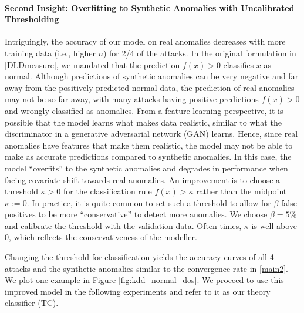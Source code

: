 \documentclass{article}
\begin{document}
\paragraph*{Second Insight: Overfitting to Synthetic Anomalies with Uncalibrated Thresholding}
Intriguingly, the accuracy of our model on real anomalies decreases with more training data (i.e., higher $n$) for 2/4 of the attacks.
In the original formulation in \eqref{DLDmeasure}, we mandated that the prediction $f(x)>0$ classifies $x$ as normal.
Although predictions of synthetic anomalies can be very negative and far away from the positively-predicted normal data, 
the prediction of real anomalies may not be so far away, with many attacks having positive predictions $f(x)>0$ and wrongly classified as anomalies.
From a feature learning perspective, it is possible that the model learns what makes data realistic, similar to what the discriminator in a generative adversarial network (GAN) learns.
Hence, since real anomalies have features that make them realistic, the model may not be able to make as accurate predictions compared to synthetic anomalies.
In this case, the model ``overfits'' to the synthetic anomalies and degrades in performance when facing covariate shift towards real anomalies.
An improvement is to choose a threshold $\kappa >0$ for the classification rule $f(x)>\kappa$ rather than the midpoint $\kappa:=0$.
In practice, it is quite common to set such a threshold to allow for $\beta$ false positives to be more ``conservative'' to detect more anomalies.
We choose $\beta=5\%$ and calibrate the threshold with the validation data.
Often times, $\kappa$ is well above 0, which reflects the conservativeness of the modeller.

Changing the threshold for classification yields the accuracy curves of all 4 attacks and the synthetic anomalies similar to the convergence rate in \eqref{main2}. 
We plot one example in Figure \ref{fig:kdd_normal_dos}.
We proceed to use this improved model in the following experiments and refer to it as our theory classifier (TC).

\end{document}
